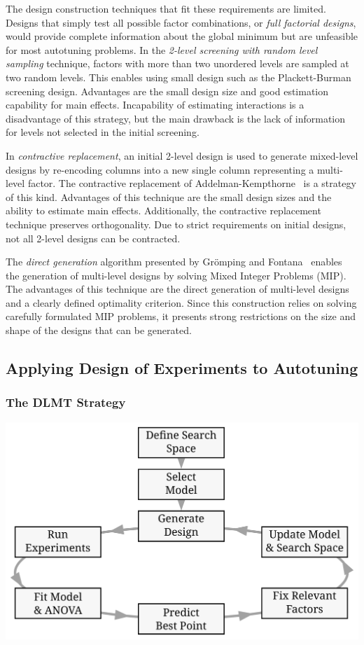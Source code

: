 \documentclass[conference]{IEEEtran}
\begin{document}
The design construction techniques that fit these requirements are limited.
Designs that simply test all possible factor combinations, or \emph{full factorial
designs}, would provide complete information about the global minimum but are
unfeasible for most autotuning problems. In the \emph{2-level screening with random
level sampling} technique, factors with more than two unordered levels are
sampled at two random levels. This enables using small design such as the
Plackett-Burman~\cite{plackett1946design} screening design. Advantages are
the small design size and good estimation capability for main effects.
Incapability of estimating interactions is a disadvantage of this strategy, but
the main drawback is the lack of information for levels not selected in the
initial screening.

In \emph{contractive replacement}, an initial 2-level design is used to generate
mixed-level designs by re-encoding columns into a new single column representing
a multi-level factor. The contractive replacement of
Addelman-Kempthorne~\cite{addelman1961some} is a strategy of this kind.
Advantages of this technique are the small design sizes and the ability to
estimate main effects. Additionally, the contractive replacement technique
preserves orthogonality. Due to strict requirements on initial designs, not all
2-level designs can be contracted.

The \emph{direct generation} algorithm presented by Grömping and
Fontana~\cite{ulrike2018algorithm} enables the generation of multi-level
designs by solving Mixed Integer Problems (MIP). The advantages of this
technique are the direct generation of multi-level designs and a clearly defined
optimality criterion. Since this construction relies on solving carefully
formulated MIP problems, it presents strong restrictions on the size and shape
of the designs that can be generated.
\subsection{Applying Design of Experiments to Autotuning}
\label{sec:org02760db}
\subsubsection{The DLMT Strategy}
\label{sec:org7b21445}
\begin{center}
\begin{center}
\includegraphics[width=.8\columnwidth]{./img/doe_anova_strategy.pdf}
\end{center}
\end{center}
\end{document}
